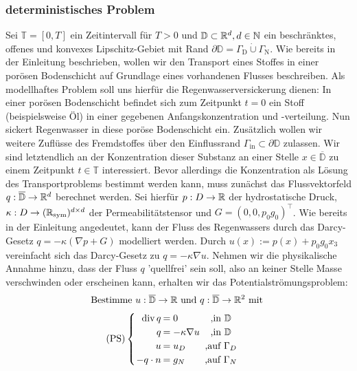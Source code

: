 \subsubsection{deterministisches Problem}
\label{det_prob}
Sei $\mathbb{T} = [0,T]$ ein Zeitintervall für $T>0$ und $\mathbb{D} \subset \mathbb{R}^d , d \in \mathbb{N}$ ein beschränktes, offenes und konvexes Lipschitz-Gebiet mit Rand $ \partial \mathbb{D} = \Gamma_{\text{D}}  \dot{\cup} \Gamma_{\text{N}} $. 
Wie bereits in der Einleitung beschrieben, wollen wir den Transport eines Stoffes in einer porösen Bodenschicht auf Grundlage eines vorhandenen Flusses beschreiben. 
Als modellhaftes Problem soll uns hierfür die Regenwasserversickerung dienen: In einer porösen Bodenschicht befindet sich zum Zeitpunkt $t=0$ ein Stoff (beispielsweise Öl) in einer gegebenen Anfangskonzentration und -verteilung. Nun sickert Regenwasser in diese poröse Bodenschicht ein. Zusätzlich wollen wir weitere Zuflüsse des Fremdstoffes über den Einflussrand $\Gamma_{\text{in}} \subset \partial \mathbb{D}$ zulassen.
Wir sind letztendlich an der Konzentration dieser Substanz an einer Stelle $x \in \overline{\mathbb{D}}$ zu einem Zeitpunkt $t \in \mathbb{T}$ interessiert. \newline
Bevor allerdings die Konzentration als Lösung des Transportproblems bestimmt werden kann, muss zunächst das Flussvektorfeld $q: \overline{\mathbb{D}} \rightarrow \mathbb{R}^d$ berechnet werden. \newline
Sei hierfür $p: D \rightarrow \mathbb{R}$ der hydrostatische Druck, $\kappa: D \rightarrow (\mathbb{R}_{\text{sym}})^{d \times d}$ der Permeabilitätstensor und $G=(0,0,p_0 g_0)^{\top}$. 
Wie bereits in der Einleitung angedeutet, kann der Fluss des Regenwassers durch das Darcy-Gesetz $q=-\kappa(\nabla p + G)$ modelliert werden.
Durch $u(x) := p(x) + p_0 g_0 x_3$ vereinfacht sich das Darcy-Gesetz zu $q=-\kappa \nabla u$.\newline
Nehmen wir die physikalische Annahme hinzu, dass der Fluss $q$ 'quellfrei' sein soll, also an keiner Stelle Masse verschwinden oder erscheinen kann, erhalten wir das Potentialströmungsproblem:
\[ \text{Bestimme } u:\overline{\mathbb{D}} \to \R \text{ und } q: \overline{\mathbb{D}} \to \R^2 \text{ mit } \newline \]
\[\setlength\arraycolsep{1pt}
\text{(PS)}\begin{cases} 
\begin{array}{rlc}
\dive q     &= 0                 &\text{ ,} \text{in } \mathbb{D}\\
q           &= - \kappa \nabla u &\text{ ,} \text{in }\mathbb{D}\\
u           &= u_D               &\text{ ,} \text{auf } \Gamma_D \\
-q \cdot n  &= g_N               &\text{ ,} \text{auf } \Gamma_N 
\end{array}
\end{cases} \\
\]
